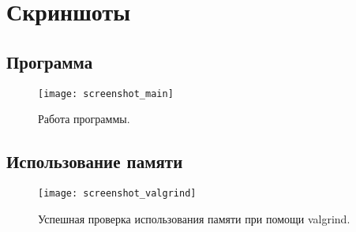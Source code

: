 \section{Скриншоты}

\subsection{Программа}
\begin{figure}[H]
  \centering
  \texttt{[image: screenshot\_main]}
  \caption{Работа программы.}
\end{figure}

\subsection{Использование памяти}
\begin{figure}[H]
  \centering
  \texttt{[image: screenshot\_valgrind]}
  \caption{Успешная проверка использования памяти при помощи valgrind.}
\end{figure}
